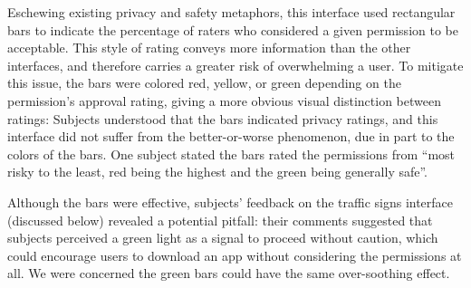 \documentclass[11pt]{article}
\begin{document}
Eschewing existing privacy and safety metaphors,
this interface used rectangular bars to indicate 
the percentage of raters who considered a given permission to be acceptable.
This style of rating conveys more information than the other
interfaces, and therefore carries a greater risk of overwhelming a user. To mitigate this 
issue, the bars were colored red, yellow, or green depending on the permission's approval 
rating, giving a more obvious visual distinction between ratings:
\label{ss-sec-pbars-r1}
Subjects understood that the bars indicated privacy ratings, 
and this interface did not suffer from the better-or-worse
phenomenon, due in part to the colors of the bars. 
One subject stated the bars rated the permissions from ``most risky to the least, 
red being the highest and the green being generally safe''.

Although the bars were effective, subjects' feedback on 
the traffic signs interface (discussed below) 
revealed a potential pitfall: their comments suggested that subjects 
perceived a green light as a signal to proceed without caution, which could 
encourage users to download an app without considering the permissions at all. 
We were concerned the green bars 
could have the same over-soothing effect.
\end{document}

